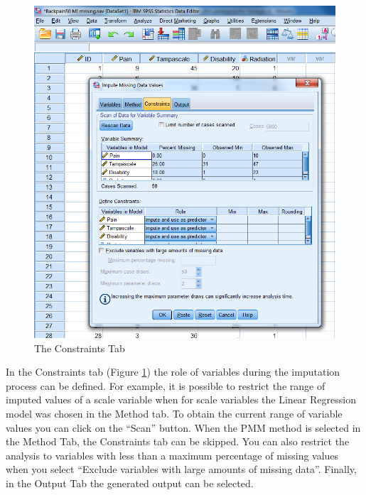 \documentclass[]{book}
\begin{document}
\begin{figure}

{\centering \includegraphics[width=0.9\linewidth]{images/fig4.8} 

}

\caption{The Constraints Tab}\label{fig:fig4-8}
\end{figure}

In the Constraints tab (Figure \ref{fig:fig4-8}) the role of variables
during the imputation process can be defined. For example, it is
possible to restrict the range of imputed values of a scale variable
when for scale variables the Linear Regression model was chosen in the
Method tab. To obtain the current range of variable values you can click
on the ``Scan'' button. When the PMM method is selected in the Method
Tab, the Constraints tab can be skipped. You can also restrict the
analysis to variables with less than a maximum percentage of missing
values when you select ``Exclude variables with large amounts of missing
data''. Finally, in the Output Tab the generated output can be selected.
\end{document}
